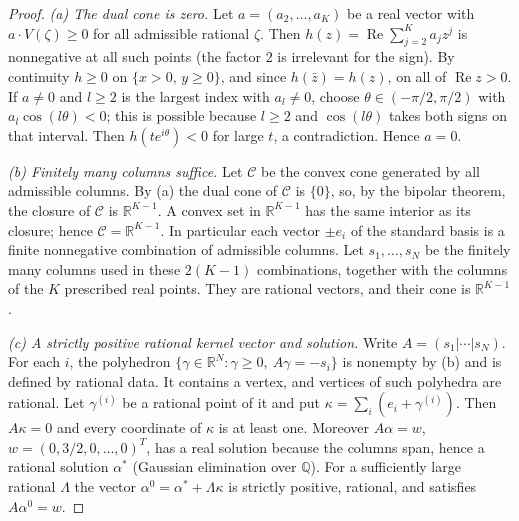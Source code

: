 \documentclass[11pt]{article}
\theoremstyle{remark}\newtheorem{remark}[theorem]{Remark}
\newcommand{\Rea}{\operatorname{Re}}
\begin{document}
\begin{proof}
\emph{(a) The dual cone is zero.}
Let \(a=(a_2,\ldots,a_K)\) be a real vector with \(a\cdot V(\zeta)\ge0\)
for all admissible rational \(\zeta\). Then \(h(z)=\Rea\sum_{j=2}^Ka_jz^j\)
is nonnegative at all such points (the factor \(2\) is irrelevant for the
sign). By continuity \(h\ge0\) on \(\{x>0,\,y\ge0\}\), and since
\(h(\bar z)=h(z)\), on all of \(\Rea z>0\). If \(a\ne0\) and
\(l\ge2\) is the largest index with \(a_l\ne0\), choose
\(\theta\in(-\pi/2,\pi/2)\) with \(a_l\cos(l\theta)<0\); this is
possible because \(l\ge2\) and \(\cos(l\theta)\) takes both signs on that
interval. Then \(h(te^{i\theta})<0\) for large \(t\), a contradiction.
Hence \(a=0\).

\emph{(b) Finitely many columns suffice.}
Let \(\mathcal C\) be the convex cone generated by all admissible columns.
By (a) the dual cone of \(\mathcal C\) is \(\{0\}\), so, by the bipolar
theorem, the closure of \(\mathcal C\) is \(\mathbb R^{K-1}\). A convex set
in \(\mathbb R^{K-1}\) has the same interior as its closure; hence
\(\mathcal C=\mathbb R^{K-1}\). In particular each vector \(\pm e_i\)
of the standard basis is a finite nonnegative combination of admissible
columns. Let \(s_1,\ldots,s_N\) be the finitely many columns used in these
\(2(K-1)\) combinations, together with the columns of the \(K\) prescribed
real points. They are rational vectors, and their cone is
\(\mathbb R^{K-1}\).

\emph{(c) A strictly positive rational kernel vector and solution.}
Write \(A=(s_1|\cdots|s_N)\). For each \(i\), the polyhedron
\(\{\gamma\in\mathbb R^N:\gamma\ge0,\ A\gamma=-s_i\}\) is nonempty by (b)
and is defined by rational data. It contains a vertex, and vertices of such
polyhedra are rational. Let \(\gamma^{(i)}\) be a rational point of it and
put \(\kappa=\sum_i(e_i+\gamma^{(i)})\). Then \(A\kappa=0\) and
every coordinate of \(\kappa\) is at least one. Moreover \(A\alpha=w\),
\(w=(0,3/2,0,\ldots,0)^T\), has a real solution because the columns span,
hence a rational solution \(\alpha^*\) (Gaussian elimination over
\(\mathbb Q\)). For a sufficiently large rational \(\Lambda\) the vector
\(\alpha^0=\alpha^*+\Lambda\kappa\) is strictly positive, rational, and
satisfies \(A\alpha^0=w\).
\end{proof}
\end{document}
